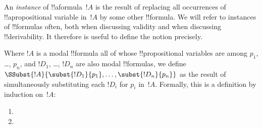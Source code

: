 \documentclass[../../../include/open-logic-section]{subfiles}
\begin{document}

An \emph{instance} of !!a{formula}~$!A$ is the result of replacing all
occurrences of !!a{propositional variable} in~$!A$ by some other
!!{formula}. We will refer to instances of !!{formula}s often, both
when discussing validity and when discussing !!{derivability}. It
therefore is useful to define the notion precisely.

\begin{defn}
  Where $!A$ is a modal !!{formula} all of whose !!{propositional
    variable}s are among $p_1$, \dots, $p_n$, and $!D_1$, \dots,
  $!D_n$ are also modal !!{formula}s, we define
  $\SSubst{!A}{\subst{!D_1}{p_1}, \dots, \subst{!D_n}{p_n}}$ as the
  result of simultaneously substituting each $!D_i$ for $p_i$
  in~$!A$. Formally, this is a definition by induction on~$!A$:
  \begin{enumerate}
    \item {}
    \item {}

\end{enumerate}
\end{defn}
\end{document}
